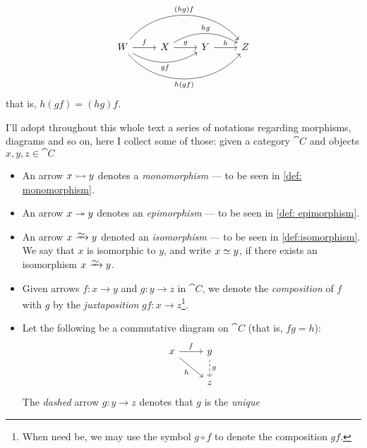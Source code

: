 \begin{definition}[Category]
\begin{enumerate}[(C1)]
              \[
                  \begin{tikzcd}
                      W
                      \ar[r, "f"]
                      \ar[rr, bend right, swap, "g  f"]
                      \ar[rrr, bend right = 50, swap, "h  (g  f)"]
                      \ar[rrr, bend left = 50, "(h  g)  f"]
                      &X
                      \ar[r, "g"] \ar[rr, bend left, "h  g"]
                      &Y
                      \ar[r, "h"]
                      &Z
                  \end{tikzcd}
              \]
              that is, \(h  (g  f) = (h  g)  f\).
    \end{enumerate}
\end{definition}

\begin{notation}
    I'll adopt throughout this whole text a series of notations regarding morphisms,
    diagrams and so on, here I collect some of those: given a category \(\cat
    C\) and objects \(x, y, z \in \cat C\)
    \begin{itemize}\setlength\itemsep{0em}
        \item An arrow \(x \rightarrowtail y\) denotes a \emph{monomorphism} --- to be seen in
              \cref{def: monomorphism}.
        \item An arrow \(x \twoheadrightarrow y\) denotes an \emph{epimorphism} --- to be seen in
              \cref{def: epimorphism}.
        \item An arrow \(x \isoto y\) denoted an \emph{isomorphism} --- to be seen in
              \cref{def:isomorphism}. We say that \(x\) is isomorphic to \(y\), and write
              \(x \simeq y\), if there exists an isomorphism \(x \isoto y\).
        \item Given arrows \(f: x \to y\) and \(g: y \to z\) in \(\cat C\), we denote
              the \emph{composition} of \(f\) with \(g\) by the \emph{juxtaposition} \(gf: x
              \to z\)\footnote{When need be, we may use the symbol \(g \circ f\) to denote
                  the composition \(g f\).}.
        \item Let the following be a commutative diagram on \(\cat C\) (that is, \(fg =
              h\)):
              \[
                  \begin{tikzcd}
                      x \ar[r, "f"] \ar[rd, swap, "h"] &y \ar[d, dashed, "g"] \\ &z
                  \end{tikzcd}
              \]
              The \emph{dashed} arrow \(g: y \to z\) denotes that \(g\) is the \emph{unique}

\end{itemize}
\end{notation}
